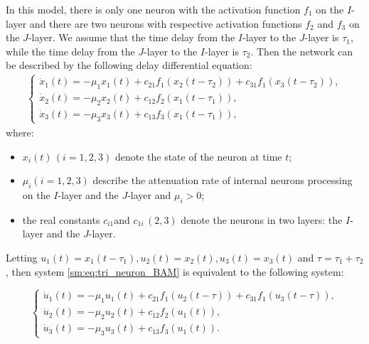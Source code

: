 In this model, there is only one neuron with the activation function
$f_{1}$ on the $I$-layer and there are two neurons with respective
activation functions $f_{2}$ and $f_{3}$ on the $J$-layer. We assume
that the time delay from the $I$-layer to the $J$-layer is $\tau_{1}$,
while the time delay from the $J$-layer to the $I$-layer is $\tau_{2}$.
Then the network can be described by the following delay differential equation:
\begin{equation}
\label{sm:eq:tri_neuron_BAM}
\begin{aligned}
\begin{cases}
\dot{x}_{1}(t) = -\mu_{1}x_{1}(t)+c_{21}f_{1}(x_{2}(t-\tau_{2}))+c_{31}f_{1}(x_{3}(t-\tau_{2})),\\
\dot{x}_{2}(t) = -\mu_{2}x_{2}(t)+c_{12}f_{2}(x_{1}(t-\tau_{1})),\\
\dot{x}_{3}(t) = -\mu_{3}x_{3}(t)+c_{13}f_{3}(x_{1}(t-\tau_{1})),
\end{cases}
\end{aligned}
\end{equation}
where:
\begin{itemize}
\item $x_{i}(t)\,(i=1,2,3)$ denote the state of the neuron at time $t$;
\item $\mu_{i}(i=1,2,3)$ describe the attenuation rate of internal neurons
processing on the $I$-layer and the $J$-layer and $\mu_{i}>0$;
\item the real constants $c_{i1}$and $c_{1i}\,(2,3)$ denote the neurons
in two layers: the $I$-layer and the $J$-layer.
\end{itemize}
Letting $u_{1}(t)=x_{1}(t-\tau_{1}),u_{2}(t)=x_{2}(t),u_{3}(t)=x_{3}(t)$
and $\tau=\tau_{1}+\tau_{2}$, then system \cref{sm:eq:tri_neuron_BAM}
is equivalent to the following system:

\begin{equation}
\label{sm:eq:tri_neuron_BAM-u}
\begin{cases}
\dot{u}_{1}(t) = -\mu_{1}u_{1}(t)+c_{21}f_{1}(u_{2}(t-\tau))+c_{31}f_{1}(u_{3}(t-\tau)),\\
\dot{u}_{2}(t) = -\mu_{2}u_{2}(t)+c_{12}f_{2}(u_{1}(t)),\\
\dot{u}_{3}(t) = -\mu_{3}u_{3}(t)+c_{13}f_{3}(u_{1}(t)).
\end{cases}
\end{equation}


